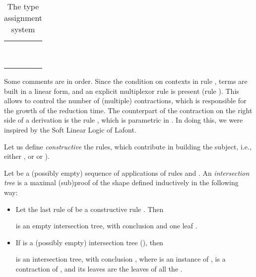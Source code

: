 \begin{table}
\small
\begin{center}
\begin{tabular}{cc}
\hline
\\

\\
\\

     \\
     \\
     
     \\
     \\
     
\\
\\
\hline

\end{tabular}
\end{center}
\caption{The type assignment system}
\label{tab:rules}
\normalsize
\end{table} 

Some comments are in order. Since the condition on contexts in rule , terms are built in a linear form, and an explicit multiplexor rule is present (rule ). This allows to control the number of (multiple) contractions, which is responsible for the growth of the reduction time. The counterpart of the contraction on the right side of a derivation is the rule , which is parametric in . In doing this, we were inspired by the Soft Linear Logic of Lafont.

Let us define {\em constructive} the rules, which contribute in building the subject, i.e., either , or  or ). 

\begin{definition}
Let  be a (possibly empty) sequence of applications of rules  and . An {\em intersection tree} is a maximal (sub)proof of the shape defined inductively in the following way:
\begin{itemize}
\item Let the last rule of  be a constructive rule . Then
\small

\normalsize
is an empty intersection tree, with conclusion  and one leaf .
\item 
If  is a (possibly empty) intersection tree (), then
\small

\normalsize
is an intersection tree, with conclusion , where  is an instance of ,  is a contraction of , and its leaves are the leaves of all the .
\end{itemize}
\end{definition}

